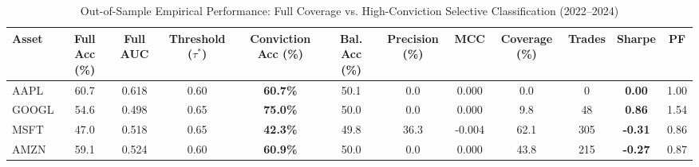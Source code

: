 \begin{table}[t]
\centering
\caption{Out-of-Sample Empirical Performance: Full Coverage vs. High-Conviction Selective Classification (2022--2024)}
\label{tab:multimodal_results}
\begin{tabular}{lccccccccccc}
\hline
\textbf{Asset} & \textbf{Full Acc (\%)} & \textbf{Full AUC} & \textbf{Threshold ($\tau^*$)} & \textbf{Conviction Acc (\%)} & \textbf{Bal. Acc (\%)} & \textbf{Precision (\%)} & \textbf{MCC} & \textbf{Coverage (\%)} & \textbf{Trades} & \textbf{Sharpe} & \textbf{PF} \\
\hline
AAPL & 60.7 & 0.618 & 0.60 & \textbf{60.7\%} & 50.1 & 0.0 & 0.000 & 0.0 & 0 & \textbf{0.00} & 1.00 \\
GOOGL & 54.6 & 0.498 & 0.65 & \textbf{75.0\%} & 50.0 & 0.0 & 0.000 & 9.8 & 48 & \textbf{0.86} & 1.54 \\
MSFT & 47.0 & 0.518 & 0.65 & \textbf{42.3\%} & 49.8 & 36.3 & -0.004 & 62.1 & 305 & \textbf{-0.31} & 0.86 \\
AMZN & 59.1 & 0.524 & 0.60 & \textbf{60.9\%} & 50.0 & 0.0 & 0.000 & 43.8 & 215 & \textbf{-0.27} & 0.87 \\
\hline
\end{tabular}
\end{table}